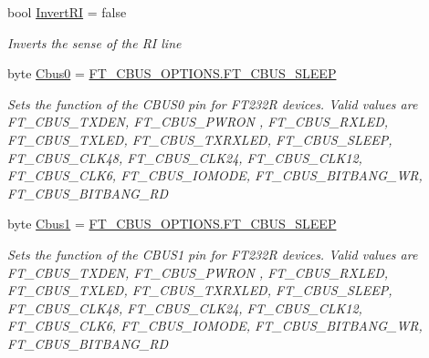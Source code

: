 \begin{DoxyCompactItemize}
bool \mbox{\hyperlink{class_f_t_d2_x_x___n_e_t_1_1_f_t_d_i_1_1_f_t232_r___e_e_p_r_o_m___s_t_r_u_c_t_u_r_e_a96b7682f7eac2f76c9b27f2f3519503d}{Invert\+RI}} = false
\begin{DoxyCompactList}\small\item\em Inverts the sense of the RI line \end{DoxyCompactList}\item 
byte \mbox{\hyperlink{class_f_t_d2_x_x___n_e_t_1_1_f_t_d_i_1_1_f_t232_r___e_e_p_r_o_m___s_t_r_u_c_t_u_r_e_a574c0e9c647cd0ec93799d274f474f17}{Cbus0}} = \mbox{\hyperlink{class_f_t_d2_x_x___n_e_t_1_1_f_t_d_i_1_1_f_t___c_b_u_s___o_p_t_i_o_n_s_a12ffdb96c52abef0df44530b144b0a80}{F\+T\+\_\+\+C\+B\+U\+S\+\_\+\+O\+P\+T\+I\+O\+N\+S.\+F\+T\+\_\+\+C\+B\+U\+S\+\_\+\+S\+L\+E\+EP}}
\begin{DoxyCompactList}\small\item\em Sets the function of the C\+B\+U\+S0 pin for F\+T232R devices. Valid values are F\+T\+\_\+\+C\+B\+U\+S\+\_\+\+T\+X\+D\+EN, F\+T\+\_\+\+C\+B\+U\+S\+\_\+\+P\+W\+R\+ON , F\+T\+\_\+\+C\+B\+U\+S\+\_\+\+R\+X\+L\+ED, F\+T\+\_\+\+C\+B\+U\+S\+\_\+\+T\+X\+L\+ED, F\+T\+\_\+\+C\+B\+U\+S\+\_\+\+T\+X\+R\+X\+L\+ED, F\+T\+\_\+\+C\+B\+U\+S\+\_\+\+S\+L\+E\+EP, F\+T\+\_\+\+C\+B\+U\+S\+\_\+\+C\+L\+K48, F\+T\+\_\+\+C\+B\+U\+S\+\_\+\+C\+L\+K24, F\+T\+\_\+\+C\+B\+U\+S\+\_\+\+C\+L\+K12, F\+T\+\_\+\+C\+B\+U\+S\+\_\+\+C\+L\+K6, F\+T\+\_\+\+C\+B\+U\+S\+\_\+\+I\+O\+M\+O\+DE, F\+T\+\_\+\+C\+B\+U\+S\+\_\+\+B\+I\+T\+B\+A\+N\+G\+\_\+\+WR, F\+T\+\_\+\+C\+B\+U\+S\+\_\+\+B\+I\+T\+B\+A\+N\+G\+\_\+\+RD \end{DoxyCompactList}\item 
byte \mbox{\hyperlink{class_f_t_d2_x_x___n_e_t_1_1_f_t_d_i_1_1_f_t232_r___e_e_p_r_o_m___s_t_r_u_c_t_u_r_e_ae8ae48454c79d5cd1b8f2374e3841790}{Cbus1}} = \mbox{\hyperlink{class_f_t_d2_x_x___n_e_t_1_1_f_t_d_i_1_1_f_t___c_b_u_s___o_p_t_i_o_n_s_a12ffdb96c52abef0df44530b144b0a80}{F\+T\+\_\+\+C\+B\+U\+S\+\_\+\+O\+P\+T\+I\+O\+N\+S.\+F\+T\+\_\+\+C\+B\+U\+S\+\_\+\+S\+L\+E\+EP}}
\begin{DoxyCompactList}\small\item\em Sets the function of the C\+B\+U\+S1 pin for F\+T232R devices. Valid values are F\+T\+\_\+\+C\+B\+U\+S\+\_\+\+T\+X\+D\+EN, F\+T\+\_\+\+C\+B\+U\+S\+\_\+\+P\+W\+R\+ON , F\+T\+\_\+\+C\+B\+U\+S\+\_\+\+R\+X\+L\+ED, F\+T\+\_\+\+C\+B\+U\+S\+\_\+\+T\+X\+L\+ED, F\+T\+\_\+\+C\+B\+U\+S\+\_\+\+T\+X\+R\+X\+L\+ED, F\+T\+\_\+\+C\+B\+U\+S\+\_\+\+S\+L\+E\+EP, F\+T\+\_\+\+C\+B\+U\+S\+\_\+\+C\+L\+K48, F\+T\+\_\+\+C\+B\+U\+S\+\_\+\+C\+L\+K24, F\+T\+\_\+\+C\+B\+U\+S\+\_\+\+C\+L\+K12, F\+T\+\_\+\+C\+B\+U\+S\+\_\+\+C\+L\+K6, F\+T\+\_\+\+C\+B\+U\+S\+\_\+\+I\+O\+M\+O\+DE, F\+T\+\_\+\+C\+B\+U\+S\+\_\+\+B\+I\+T\+B\+A\+N\+G\+\_\+\+WR, F\+T\+\_\+\+C\+B\+U\+S\+\_\+\+B\+I\+T\+B\+A\+N\+G\+\_\+\+RD \end{DoxyCompactList}\item 

\end{DoxyCompactItemize}

